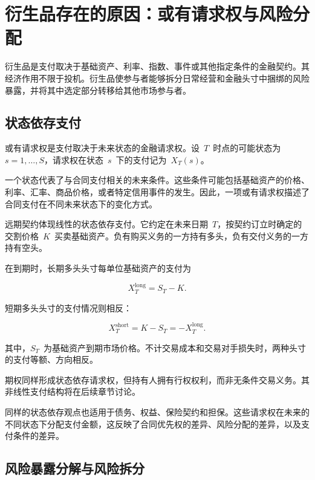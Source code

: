 \section[衍生品存在的原因：或有请求权与风险分配]{衍生品存在的原因：或有请求权与风险分配}

衍生品是支付取决于基础资产、利率、指数、事件或其他指定条件的金融契约。其经济作用不限于投机。衍生品使参与者能够拆分日常经营和金融头寸中捆绑的风险暴露，并将其中选定部分转移给其他市场参与者。

\subsection{状态依存支付}

或有请求权是支付取决于未来状态的金融请求权。设~$T$~时点的可能状态为~$s=1,\ldots,S$，请求权在状态~$s$~下的支付记为~$X_T(s)$。

一个状态代表了与合同支付相关的未来条件。这些条件可能包括基础资产的价格、利率、汇率、商品价格，或者特定信用事件的发生。因此，一项或有请求权描述了合同支付在不同未来状态下的变化方式。

远期契约体现线性的状态依存支付。它约定在未来日期~$T$，按契约订立时确定的交割价格~$K$~买卖基础资产。负有购买义务的一方持有多头，负有交付义务的一方持有空头。

在到期时，长期多头头寸每单位基础资产的支付为

\begin{equation}
X_T^{\mathrm{long}}
=
S_T-K.
\label{eq:ch11-forward-long-payoff}
\end{equation}

短期多头头寸的支付情况则相反：

\begin{equation}
X_T^{\mathrm{short}}
=
K-S_T
=
-X_T^{\mathrm{long}}.
\label{eq:ch11-forward-short-payoff}
\end{equation}

其中，$S_T$~为基础资产到期市场价格。不计交易成本和交易对手损失时，两种头寸的支付等额、方向相反。

期权同样形成状态依存请求权，但持有人拥有行权权利，而非无条件交易义务。其非线性支付结构将在后续章节讨论。

同样的状态依存观点也适用于债务、权益、保险契约和担保。这些请求权在未来的不同状态下分配支付金额，这反映了合同优先权的差异、风险分配的差异，以及支付条件的差异。

\subsection{风险暴露分解与风险拆分}

